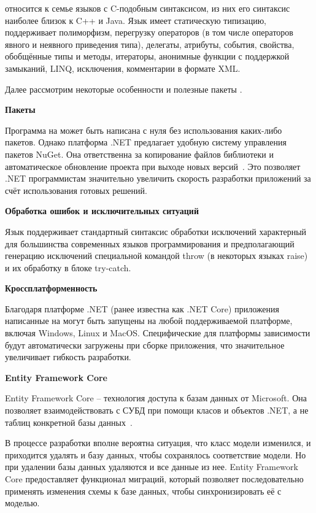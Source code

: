 \csharp относится к семье языков с C-подобным синтаксисом, из них его синтаксис наиболее близок к C++ и Java. Язык имеет статическую типизацию, поддерживает полиморфизм, перегрузку операторов (в том числе операторов явного и неявного приведения типа), делегаты, атрибуты, события, свойства, обобщённые типы и методы, итераторы, анонимные функции с поддержкой замыканий, LINQ, исключения, комментарии в формате XML.

Далее рассмотрим некоторые особенности и полезные пакеты \csharp.

\bigskip
\textbf{Пакеты}

Программа на \csharp может быть написана с нуля без использования каких-либо пакетов. Однако платформа .NET предлагает удобную систему управления пакетов NuGet. Она ответственна за копирование файлов библиотеки и автоматическое обновление проекта при выходе новых версий~\cite{wiki_nuget}. Это позволяет .NET программистам значительно увеличить скорость разработки приложений за счёт использования готовых решений.

\bigskip
\textbf{Обработка ошибок и исключительных ситуаций}

Язык \csharp поддерживает стандартный синтаксис обработки исключений характерный для большинства современных языков программирования и предполагающий генерацию исключений специальной командой throw (в некоторых языках raise) и их обработку в блоке try-catch.

\bigskip
\textbf{Кроссплатформенность}

Благодаря платформе .NET (ранее известна как .NET Core) приложения написанные на \csharp могут быть запущены на любой поддерживаемой платформе, включая Windows, Linux и MacOS. Специфические для платформы зависимости будут автоматически загружены при сборке приложения, что значительное увеличивает гибкость разработки.

\bigskip
\textbf{Entity Framework Core}

Entity Framework Core – технология доступа к базам данных от Microsoft. Она позволяет взаимодействовать с СУБД при помощи класов и объектов .NET, а не таблиц конкретной базы данных~\cite{enity_framework}.

В процессе разработки вполне вероятна ситуация, что класс модели изменился, и приходится удалять и базу данных, чтобы сохранялось соответствие модели. Но при удалении базы данных удаляются и все данные из нее. Entity Framework Core предоставляет функционал миграций, который позволяет последовательно применять изменения схемы к базе данных, чтобы синхронизировать её с моделью.


